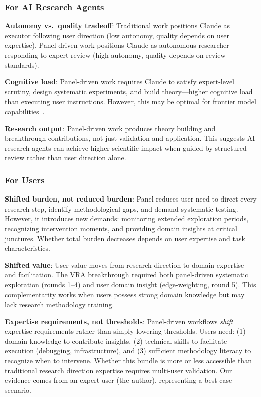 \subsubsection{For AI Research Agents}

\textbf{Autonomy vs.\ quality tradeoff}: Traditional work positions Claude as executor following user direction (low autonomy, quality depends on user expertise). Panel-driven work positions Claude as autonomous researcher responding to expert review (high autonomy, quality depends on review standards).

\textbf{Cognitive load}: Panel-driven work requires Claude to satisfy expert-level scrutiny, design systematic experiments, and build theory---higher cognitive load than executing user instructions. However, this may be optimal for frontier model capabilities~\cite{anthropic2025sonnet45}.

\textbf{Research output}: Panel-driven work produces theory building and breakthrough contributions, not just validation and application. This suggests AI research agents can achieve higher scientific impact when guided by structured review rather than user direction alone.

\subsubsection{For Users}

\textbf{Shifted burden, not reduced burden}: Panel reduces user need to direct every research step, identify methodological gaps, and demand systematic testing. However, it introduces new demands: monitoring extended exploration periods, recognizing intervention moments, and providing domain insights at critical junctures. Whether total burden decreases depends on user expertise and task characteristics.

\textbf{Shifted value}: User value moves from research direction to domain expertise and facilitation. The VRA breakthrough required both panel-driven systematic exploration (rounds 1--4) and user domain insight (edge-weighting, round 5). This complementarity works when users possess strong domain knowledge but may lack research methodology training.

\textbf{Expertise requirements, not thresholds}: Panel-driven workflows \textit{shift} expertise requirements rather than simply lowering thresholds. Users need: (1) domain knowledge to contribute insights, (2) technical skills to facilitate execution (debugging, infrastructure), and (3) sufficient methodology literacy to recognize when to intervene. Whether this bundle is more or less accessible than traditional research direction expertise requires multi-user validation. Our evidence comes from an expert user (the author), representing a best-case scenario.

